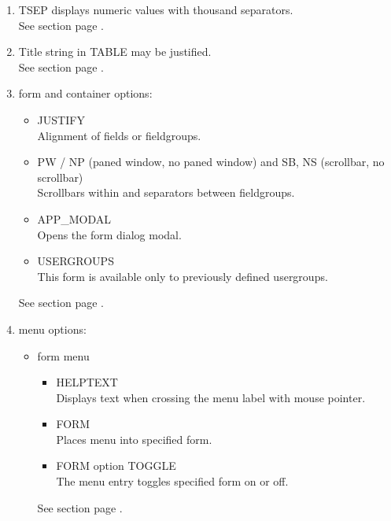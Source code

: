 \begin{enumerate}
\item TSEP displays numeric values with thousand separators. \\
See section  page \pageref{dia:uifieldattributes}. \\
\item Title string in TABLE may be justified. \\
See section  page \pageref{sec:uitable}. \\
\item form and container options:
\begin{itemize}
\item JUSTIFY \\
    Alignment of fields or fieldgroups.
\item PW / NP (paned window, no paned window) and SB, NS (scrollbar, no scrollbar) \\
   Scrollbars within and separators between fieldgroups.
\item APP\_MODAL \\
   Opens the form dialog modal.
\item USERGROUPS \\
  This form is available only to previously defined usergroups.
\end{itemize}
  See section  page \pageref{sec:uiform}. \\
\item menu options:
 \begin{itemize}
  \item form menu \\
    \begin{itemize}
    \item HELPTEXT \\
    Displays text when crossing the menu label with mouse pointer.
    \item FORM \\
    Places menu into specified form.\\
    \item FORM option TOGGLE \\
    The menu entry toggles specified form on or off.\\
    \end{itemize}
  See section  page \pageref{sec:uimenuid}. \\

\end{itemize}
\end{enumerate}
